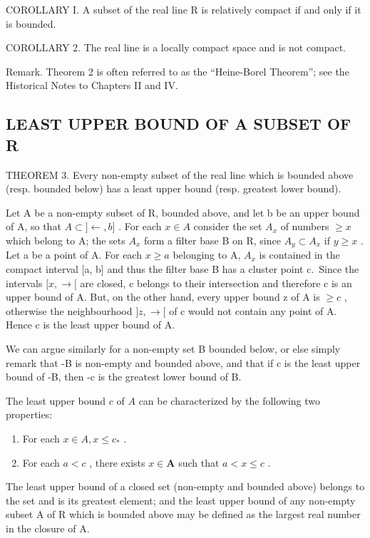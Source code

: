 COROLLARY I. A subset of the real line R is relatively compact if and only if it is bounded.

COROLLARY 2. The real line is a locally compact space and is not compact.

Remark. Theorem 2 is often referred to as the ``Heine-Borel Theorem''; see the Historical Notes to Chapters II and IV.

\subsection{LEAST UPPER BOUND OF A SUBSET OF R}

THEOREM 3. Every non-empty subset of the real line which is bounded above (resp. bounded below) has a least upper bound (resp. greatest lower bound).

Let A be a non-empty subset of R, bounded above, and let b be an upper bound of A, so that \(A \subset ] \leftarrow, b]\) . For each \(x \in A\) consider the set \(A_x\) of numbers \(\geqslant x\) which belong to A; the sets \(A_x\) form a filter base B on R, since \(A_y \subset A_x\) if \(y \geqslant x\) . Let a be a point of A. For each \(x \geqslant a\) belonging to A, \(A_x\) is contained in the compact interval {[}a, b{]} and thus the filter base B has a cluster point c.~Since the intervals \([x, \rightarrow[\) are closed, c belongs to their intersection and therefore c is an upper bound of A. But, on the other hand, every upper bound z of A is \(\geqslant c\) , otherwise the neighbourhood \(]z, \rightarrow[\) of c would not contain any point of A. Hence c is the least upper bound of A.

We can argue similarly for a non-empty set B bounded below, or else simply remark that -B is non-empty and bounded above, and that if c is the least upper bound of -B, then -c is the greatest lower bound of B.

The least upper bound \(c\) of \(A\) can be characterized by the following two properties:

\begin{enumerate}
\def\labelenumi{(\roman{enumi})}
\item
  For each \(x \in A, x \leqslant c_*\) .
\item
  For each \(a < c\) , there exists \(x \in \mathbf{A}\) such that \(a < x \leqslant c\) .
\end{enumerate}

The least upper bound of a closed set (non-empty and bounded above) belongs to the set and is its greatest element; and the least upper bound of any non-empty subset A of R which is bounded above may be defined as the largest real number in the closure of A.

